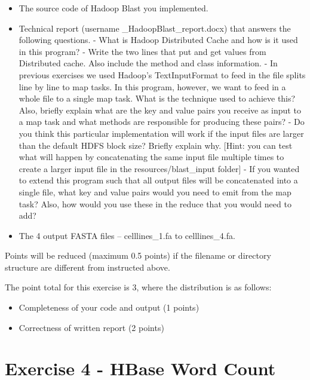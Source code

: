 \begin{itemize}
\item
  The source code of Hadoop Blast you implemented.
\item
  Technical report (username \_HadoopBlast\_report.docx) that answers
  the following questions. - What is Hadoop Distributed Cache and how is
  it used in this program? - Write the two lines that put and get values
  from Distributed cache. Also include the method and class information.
  - In previous exercises we used Hadoop's TextInputFormat to feed in the
  file splits line by line to map tasks. In this program, however, we
  want to feed in a whole file to a single map task. What is the
  technique used to achieve this? Also, briefly explain what are the key
  and value pairs you receive as input to a map task and what methods
  are responsible for producing these pairs? - Do you think this
  particular implementation will work if the input files are larger than
  the default HDFS block size? Briefly explain why. [Hint: you can
  test what will happen by concatenating the same input file multiple
  times to create a larger input file in the resources/blast\_input
  folder] - If you wanted to extend this program such that all output
  files will be concatenated into a single file, what key and value
  pairs would you need to emit from the map task? Also, how would you
  use these in the reduce that you would need to add?
\item
  The 4 output FASTA files -- celllines\_1.fa to celllines\_4.fa.
\end{itemize}

Points will be reduced (maximum 0.5 points) if the filename or directory
structure are different from instructed above.

The point total for this exercise is 3, where the distribution is as
follows:

\begin{itemize}
\item
  Completeness of your code and output (1 points)
\item
  Correctness of written report (2 points)
\end{itemize}



\chapter{Exercise 4 - HBase Word Count}\label{project-4}

